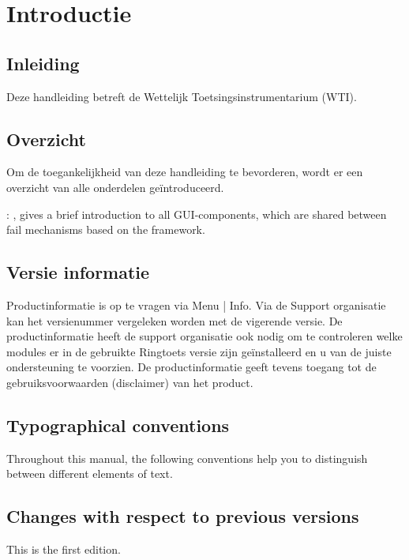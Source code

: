 
\chapter{Introductie\label{chap:guide}}

\section{Inleiding}
Deze handleiding betreft de Wettelijk Toetsingsinstrumentarium (WTI).

\section{Overzicht}
Om de toegankelijkheid van deze handleiding te bevorderen, wordt er een overzicht van alle onderdelen ge\"{i}ntroduceerd.

: , gives a brief introduction to all GUI-components, which are shared between fail mechanisms based on the framework.

\section{Versie informatie}
Productinformatie is op te vragen via Menu | Info. Via de Support organisatie kan het versienummer
vergeleken worden met de vigerende versie. De productinformatie heeft de support
organisatie ook nodig om te controleren welke modules er in de gebruikte Ringtoets versie
zijn geïnstalleerd en u van de juiste ondersteuning te voorzien. De productinformatie geeft
tevens toegang tot de gebruiksvoorwaarden (disclaimer) van het product.

\section{Typographical conventions}
Throughout this manual, the following conventions help you to distinguish between different
elements of text.


\section{Changes with respect to previous versions}
This is the first edition.